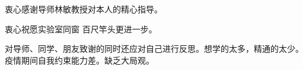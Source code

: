 \begin{acknowledgement}
    衷心感谢导师林敏教授对本人的精心指导。

    衷心祝愿实验室同窗 百尺竿头更进一步。

    对导师、同学、朋友致谢的同时还应对自己进行反思。想学的太多，精通的太少。疫情期间自我约束能力差。缺乏大局观。
\end{acknowledgement}
